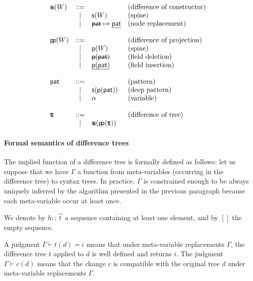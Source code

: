 \documentclass[a4paper,11pt]{article}
\renewcommand\vec[1]{\overrightarrow{#1}}
\newcommand\del[1]{\text{\st{$#1$}}}
\newcommand\ins[1]{\text{\ul{$#1$}}}
\begin{document}
\[\begin{array}{lcll}
\aSpineSum(W) & ::= & & \text{(difference of constructor)} \\
        & |   & \aSum(W) & \text{(spine)} \\
        & |   & \defReplace \aPatternTree \aPatternTree & \text{(node replacement)} \\
\\
\aSpineProd(W) & ::= & & \text{(difference of projection)} \\
                 & |   & \aProd(W) & \text{(spine)} \\
                 & |   & \del{\aProd(\aPatternTree)} & \text{(field deletion)} \\
                 & |   & \ins{\aProd(\aPatternTree)} & \text{(field insertion)} \\
\\
\aPatternTree & ::= & & \text{(pattern)} \\
        & |   & \aSum(\aProd(\aPatternTree)) & \text{(deep pattern)}\\
        & |   & \aVar & \text{(variable)} \\
\\
\aDiffTree & ::= & & \text{(difference of tree)} \\
           & |   & \aSpineSum(\aSpineProd(\aDiffTree))
\end{array}\]

\paragraph{Formal semantics of difference trees}

The implied function of a difference tree is formally defined as follows: let
us suppose that we have $\Gamma$ a function from meta-variables (occurring in
the difference tree) to syntax trees. In practice, $\Gamma$ is constrained
enough to be always uniquely inferred by the algorithm presented in the
previous paragraph because each meta-variable occur at least once.

We denote by $h :: \vec{t}$ a sequence containing at least one element, and by
$[]$ the empty sequence.

A judgment $\Gamma \vdash t(d) = i$ means that under meta-variable replacements
$\Gamma$, the difference tree $t$ applied to $d$ is well defined and returns
$i$. The judgment $\Gamma \vdash c(d)$ means that the change $c$ is compatible
with the original tree $d$ under meta-variable replacements $\Gamma$.
\end{document}
